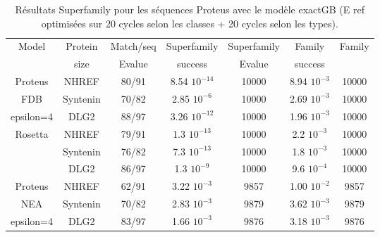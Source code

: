\begin{table}[h]
  \raggedleft{}
  
  \begin{tabular}{ccccccc}
    
    \toprule
    Model &Protein & Match/seq & Superfamily & Superfamily & Family & Family \\
            & size      & Evalue      & success     & Evalue & success\\
    \cmidrule{1-7}
    Proteus                   & NHREF     & 80/91  &  8.54 $10^{-14}$  & 10000  & 8.94 $10^{-3}$ & 10000 \\
    FDB                       & Syntenin  & 70/82  &  2.85 $10^{-6}$   & 10000  & 2.69 $10^{-3}$ & 10000 \\
    epsilon=4                 & DLG2      & 88/97  &  3.26 $10^{-12}$  & 10000  & 1.96 $10^{-3}$ & 10000 \\
    \cmidrule{1-7}
    \multirow{3}{*}{Rosetta}  & NHREF     & 79/91  &  1.3 $10^{-13}$ & 10000    & 2.2 $10^{-3}$ & 10000 \\
                              & Syntenin  & 76/82  &  7.3 $10^{-13}$ & 10000    & 1.8 $10^{-3}$ & 10000 \\
                              & DLG2      & 86/97  &  1.3 $10^{-9}$  & 10000    & 9.6 $10^{-4}$ & 10000 \\    
    \cmidrule{1-7}
    Proteus                   & NHREF     & 62/91 &   3.22 $10^{-3}$  & 9857    & 1.00 $10^{-2}$ & 9857 \\
    NEA                       & Syntenin  & 70/82 &   2.83 $10^{-3}$  & 9879    & 3.62 $10^{-3}$ & 9879 \\
    epsilon=4                 & DLG2      & 83/97 &   1.66 $10^{-3}$  & 9876    & 3.18 $10^{-3}$ & 9876 \\ 
    \bottomrule        
  \end{tabular}   
  \caption{Résultats Superfamily pour les séquences Proteus avec le modèle exactGB (E ref optimisées sur 20 cycles selon les classes + 20 cycles selon les types).}   
  \label{tab:superfamily3prot}       
\end{table}




